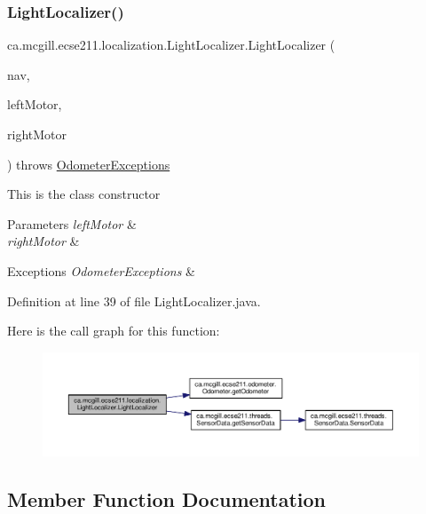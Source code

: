 \subsubsection{\texorpdfstring{Light\+Localizer()}{LightLocalizer()}}
{\footnotesize\ttfamily ca.\+mcgill.\+ecse211.\+localization.\+Light\+Localizer.\+Light\+Localizer (\begin{DoxyParamCaption}\item[{\hyperlink{classca_1_1mcgill_1_1ecse211_1_1project_1_1_navigation}{Navigation}}]{nav,  }\item[{E\+V3\+Large\+Regulated\+Motor}]{left\+Motor,  }\item[{E\+V3\+Large\+Regulated\+Motor}]{right\+Motor }\end{DoxyParamCaption}) throws \hyperlink{classca_1_1mcgill_1_1ecse211_1_1odometer_1_1_odometer_exceptions}{Odometer\+Exceptions}}

This is the class constructor


\begin{DoxyParams}{Parameters}
{\em left\+Motor} & \\
\hline
{\em right\+Motor} & \\
\hline
\end{DoxyParams}

\begin{DoxyExceptions}{Exceptions}
{\em Odometer\+Exceptions} & \\
\hline
\end{DoxyExceptions}


Definition at line 39 of file Light\+Localizer.\+java.

Here is the call graph for this function\+:
\nopagebreak
\begin{figure}[H]
\begin{center}
\leavevmode
\includegraphics[width=350pt]{classca_1_1mcgill_1_1ecse211_1_1localization_1_1_light_localizer_aa37a75b7c32c02fe261845021f0734b7_cgraph}
\end{center}
\end{figure}


\subsection{Member Function Documentation}
\mbox{\label{classca_1_1mcgill_1_1ecse211_1_1localization_1_1_light_localizer_a9fc3d6cdd897e9db86fc9d71dc914863}} 
